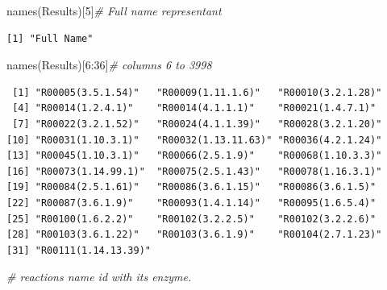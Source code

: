 \documentclass[
  letterpaper,
  DIV=11,
  numbers=noendperiod]{scrreprt}
\newenvironment{Shaded}{}{}
\newcommand{\CommentTok}[1]{\textcolor[rgb]{0.36,0.39,0.44}{\textit{#1}}}
\newcommand{\DecValTok}[1]{\textcolor[rgb]{0.82,0.60,0.40}{#1}}
\newcommand{\FunctionTok}[1]{\textcolor[rgb]{0.38,0.69,0.94}{#1}}
\newcommand{\NormalTok}[1]{\textcolor[rgb]{0.67,0.70,0.75}{#1}}
\newcommand{\OtherTok}[1]{\textcolor[rgb]{0.15,0.68,0.38}{#1}}
\newcommand{\SpecialCharTok}[1]{\textcolor[rgb]{0.34,0.71,0.76}{#1}}
\newcommand{\StringTok}[1]{\textcolor[rgb]{0.60,0.76,0.47}{#1}}
\begin{document}
\begin{Shaded}
\begin{Highlighting}[]
\FunctionTok{names}\NormalTok{(Results)[}\DecValTok{5}\NormalTok{]}\CommentTok{\# Full name representant}
\end{Highlighting}
\end{Shaded}

\begin{verbatim}
[1] "Full Name"
\end{verbatim}

\begin{Shaded}
\begin{Highlighting}[]
\FunctionTok{names}\NormalTok{(Results)[}\DecValTok{6}\SpecialCharTok{:}\DecValTok{36}\NormalTok{]}\CommentTok{\# columns 6 to 3998 }
\end{Highlighting}
\end{Shaded}

\begin{verbatim}
 [1] "R00005(3.5.1.54)"   "R00009(1.11.1.6)"   "R00010(3.2.1.28)"  
 [4] "R00014(1.2.4.1)"    "R00014(4.1.1.1)"    "R00021(1.4.7.1)"   
 [7] "R00022(3.2.1.52)"   "R00024(4.1.1.39)"   "R00028(3.2.1.20)"  
[10] "R00031(1.10.3.1)"   "R00032(1.13.11.63)" "R00036(4.2.1.24)"  
[13] "R00045(1.10.3.1)"   "R00066(2.5.1.9)"    "R00068(1.10.3.3)"  
[16] "R00073(1.14.99.1)"  "R00075(2.5.1.43)"   "R00078(1.16.3.1)"  
[19] "R00084(2.5.1.61)"   "R00086(3.6.1.15)"   "R00086(3.6.1.5)"   
[22] "R00087(3.6.1.9)"    "R00093(1.4.1.14)"   "R00095(1.6.5.4)"   
[25] "R00100(1.6.2.2)"    "R00102(3.2.2.5)"    "R00102(3.2.2.6)"   
[28] "R00103(3.6.1.22)"   "R00103(3.6.1.9)"    "R00104(2.7.1.23)"  
[31] "R00111(1.14.13.39)"
\end{verbatim}

\begin{Shaded}
\begin{Highlighting}[]
\CommentTok{\# reactions name id with its enzyme.}
\end{Highlighting}
\end{Shaded}

\begin{Shaded}
\end{Shaded}
\end{document}
